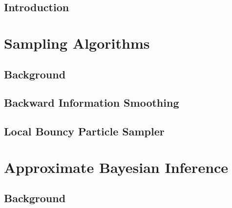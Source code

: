 
\singlespacing
\setcounter{tocdepth}{2}
\setcounter{secnumdepth}{2}
\iftoc\tableofcontents\fi
{}
\setcounter{page}{1}
\onehalfspacing

\raggedbottom



\doublespacing


\chapter{Introduction}\setcounter{page}{1}

\ifintro\fi

\part{Sampling Algorithms} %

\chapter{Background}

\ifbgs\fi

\chapter{\label{chap:BIS}Backward Information Smoothing}

\iftfs\fi

\chapter{Local Bouncy Particle Sampler}

\iflbps\fi

\part{Approximate Bayesian Inference} %

\chapter{Background}

